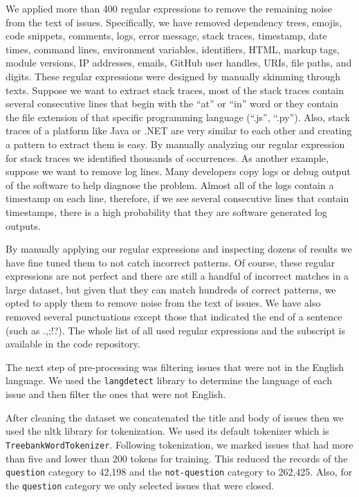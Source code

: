 \documentclass[conference]{IEEEtran}
\begin{document}
We applied more than 400 regular expressions to remove the remaining noise from the text of issues. Specifically,
we have removed dependency trees, emojis, code snippets, comments, logs,
error message, stack traces, timestamp, date times, command lines, environment variables, identifiers,
HTML, markup tags, module versions, IP addresses, emails, GitHub user handles, URIs, file paths, and digits.
These regular expressions were designed by manually skimming through texts. Suppose we want to extract
stack traces, most of the stack traces contain several consecutive lines that begin with 
the ``at'' or ``in'' word or they contain the file extension of that specific 
programming language (``.js'', ``.py''). Also, stack traces of a platform like Java or .NET are 
very similar to each other and creating a pattern to extract them is easy.
By manually analyzing our regular expression for stack traces we identified thousands
of occurrences. As another example, suppose we want to remove log lines. Many developers copy logs or debug
output of the software to help diagnose the problem. Almost all of the logs contain a timestamp on
each line, therefore, if we see several consecutive lines that contain timestamps, there is 
a high probability that they are software generated log outputs.

By manually applying our regular expressions and inspecting dozens of results we have fine tuned 
them to not catch incorrect patterns. Of course, these regular expressions are not perfect and there are 
still a handful of incorrect matches in a large dataset, but given that they can match hundreds of correct patterns, 
we opted to apply them to remove noise from the text of issues. We have also removed several punctuations except 
those that indicated the end of a sentence (such as .,;!?). The whole list of all used regular expressions and the subscript
is available in the code repository.

The next step of pre-processing was filtering issues that were not in the English language. We used 
the \verb|langdetect| \cite{web:langdetect} library to determine the language of each issue 
and then filter the ones that were not English.

After cleaning the dataset we concatenated the title and body of issues then we used the nltk library for 
tokenization. We used its default tokenizer which is \verb|TreebankWordTokenizer|. Following 
tokenization, we marked issues that had more than five and lower than 200 tokens for training. 
This reduced the records of the \verb|question| category 
to 42,198 and the \verb|not-question| category to 262,425. Also, for the \verb|question| category we only selected
issues that were closed. 
\end{document}
